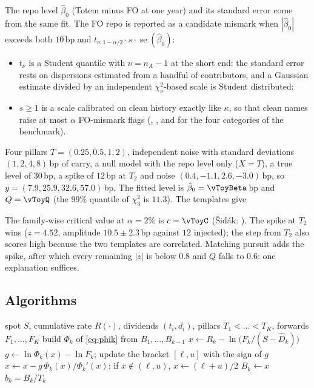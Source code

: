 The repo level $\hat\beta_0$ (Totem minus FO at one year) and its standard error come from the same fit. The FO repo is
reported as a candidate mismark when $|\hat\beta_0|$ exceeds both $10$\,bp and $t_{\nu,1-\alpha/2}\cdot s\cdot\operatorname{se}(\hat\beta_0)$:
\begin{itemize}
\item $t_\nu$ is a Student quantile with $\nu=n_{A}-1$ at the short end: the standard error rests on dispersions
estimated from a handful of contributors, and a Gaussian estimate divided by an independent $\chi^2_\nu$-based scale is
Student distributed;
\item $s\ge1$ is a scale calibrated on clean history exactly like $\kappa$, so that clean names raise at most
$\alpha$ FO-mismark flags (\vLevelScaleEuStock, \vLevelScaleUsStock, \vLevelScaleHtb{} and \vLevelScaleIndex{} for the
four categories of the benchmark).
\end{itemize}

\begin{example}\label{ex-toy}
Four pillars $T=(0.25,0.5,1,2)$, independent noise with standard deviations $(1,2,4,8)$\,bp of carry, a null model
with the repo level only ($X=T$), a true level of $30$\,bp, a spike of $12$\,bp at $T_2$ and noise
$(0.4,-1.1,2.6,-3.0)$\,bp, so $y=(7.9,25.9,32.6,57.0)$\,bp. The fitted level is $\hat\beta_0=\vToyBeta$\,bp and
$Q=\vToyQ$ (the $99\%$ quantile of $\chi^2_3$ is $11.3$). The \vToyM{} templates give
\begin{center}\end{center}
The family-wise critical value at $\alpha=2\%$ is $c=\vToyC$ (Šidák: \vToyCsidak). The spike at $T_2$ wins
($z=4.52$, amplitude $10.5\pm2.3$\,bp against $12$ injected); the step from $T_2$ also scores high because the two
templates are correlated. Matching pursuit adds the spike, after which every remaining $|z|$ is below $0.8$ and $Q$
falls to $0.6$: one explanation suffices.
\end{example}

\subsection{Algorithms}
\begin{algorithm}[ht]
\caption{Implied repo bootstrap}\label{alg-bootstrap}
\begin{algorithmic}[1]
\Require spot $S$, cumulative rate $R(\cdot)$, dividends $(t_i,d_i)$, pillars $T_1<\dots<T_K$, forwards $F_1,\dots,F_K$
  \State build $\Phi_k$ of \cref{eq-phik} from $B_1,\dots,B_{k-1}$
  \State $x\gets R_k-\ln\bigl(F_k/(S-\hat D_k)\bigr)$ 
  \Repeat
    \State $g\gets\ln\Phi_k(x)-\ln F_k$; update the bracket $[\ell,u]$ with the sign of $g$
    \State $x\gets x-g\,\Phi_k(x)/\Phi_k'(x)$; if $x\notin(\ell,u)$, $x\gets(\ell+u)/2$
  \State $B_k\gets x$
\EndFor
\State \Return $b_k=B_k/T_k$
\end{algorithmic}
\end{algorithm}

